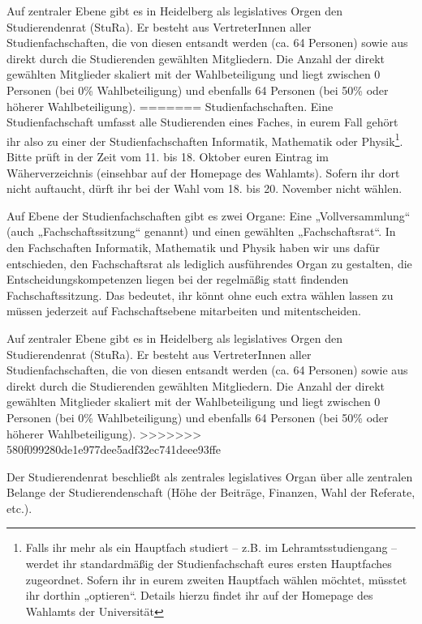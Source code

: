 Auf zentraler Ebene gibt es in Heidelberg als legislatives Orgen den
Studierendenrat (StuRa).  Er besteht aus VertreterInnen aller
Studienfachschaften, die von diesen entsandt werden (ca. 64 Personen) sowie aus
direkt durch die Studierenden gewählten Mitgliedern.  Die Anzahl der direkt
gewählten Mitglieder skaliert mit der Wahlbeteiligung und liegt zwischen 0
Personen (bei 0\% Wahlbeteiligung) und ebenfalls 64 Personen (bei 50\% oder
höherer Wahlbeteiligung).
=======
Studienfachschaften. Eine Studienfachschaft umfasst alle
Studierenden eines Faches, in eurem Fall gehört ihr also zu einer der
Studienfachschaften Informatik, Mathematik oder Physik\footnote{Falls ihr
mehr als ein Hauptfach studiert -- z.B. im Lehramtsstudiengang -- werdet
ihr standardmäßig der Studienfachschaft eures ersten Hauptfaches zugeordnet.
Sofern ihr in eurem zweiten Hauptfach wählen möchtet, müsstet ihr dorthin „optieren“.
Details hierzu findet ihr auf der Homepage des Wahlamts der Universität}.
Bitte prüft in der Zeit vom 11. bis 18. Oktober euren Eintrag im Wäherverzeichnis
(einsehbar auf der Homepage des Wahlamts). Sofern ihr dort nicht auftaucht,
dürft ihr bei der Wahl vom 18. bis 20. November nicht wählen.

Auf Ebene der Studienfachschaften gibt es zwei Organe: Eine „Vollversammlung“ 
(auch „Fachschaftssitzung“ genannt) und einen gewählten „Fachschaftsrat“. In den 
Fachschaften Informatik, Mathematik und Physik haben wir uns dafür entschieden, 
den Fachschaftsrat als lediglich ausführendes Organ zu gestalten, die 
Entscheidungskompetenzen liegen bei der regelmäßig statt findenden Fachschaftssitzung.
Das bedeutet, ihr könnt ohne euch extra wählen lassen zu müssen jederzeit
auf Fachschaftsebene mitarbeiten und mitentscheiden.

Auf zentraler Ebene gibt es in Heidelberg als legislatives Orgen den Studierendenrat (StuRa). 
Er besteht aus VertreterInnen aller Studienfachschaften, die von diesen entsandt werden
(ca. 64 Personen) sowie aus direkt durch die Studierenden gewählten Mitgliedern.
Die Anzahl der direkt gewählten Mitglieder skaliert mit der Wahlbeteiligung
und liegt zwischen 0 Personen (bei 0\% Wahlbeteiligung) und ebenfalls 64 Personen
(bei 50\% oder höherer Wahlbeteiligung).
>>>>>>> 580f099280de1e977dee5adf32ec741deee93ffe

Der Studierendenrat beschließt als zentrales legislatives Organ über alle
zentralen Belange der Studierendenschaft (Höhe der Beiträge, Finanzen,
Wahl der Referate, etc.).

